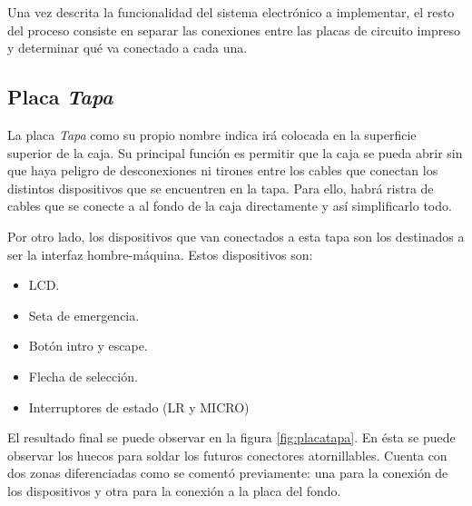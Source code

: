 Una vez descrita la funcionalidad del sistema electrónico a implementar, el resto del proceso consiste en 
separar las conexiones entre las placas de circuito impreso y determinar qué va conectado a cada una.

\subsection{Placa \textit{Tapa}}

La placa \textit{Tapa} como su propio nombre indica irá colocada en la superficie superior de la caja. Su 
principal función es permitir que la caja se pueda abrir sin que haya peligro de desconexiones ni tirones
entre los cables que conectan los distintos dispositivos que se encuentren en la tapa. Para ello, habrá
ristra de cables que se conecte a al fondo de la caja directamente y así simplificarlo todo.

Por otro lado, los dispositivos que van conectados a esta tapa son los destinados a ser la interfaz 
hombre-máquina. Estos dispositivos son:
\begin{itemize}
    \item LCD.
    \item Seta de emergencia.
    \item Botón intro y escape.
    \item Flecha de selección.
    \item Interruptores de estado (LR y MICRO)
\end{itemize}

El resultado final se puede observar en la figura \ref{fig:placatapa}. En ésta se puede observar los 
huecos para soldar los futuros conectores atornillables. Cuenta con dos zonas diferenciadas como se 
comentó previamente: una para la conexión de los dispositivos y otra para la conexión a la placa del 
fondo.

